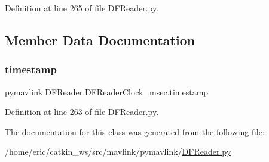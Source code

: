 Definition at line 265 of file D\+F\+Reader.\+py.



\subsection{Member Data Documentation}
\mbox{\label{classpymavlink_1_1DFReader_1_1DFReaderClock__msec_a98740f18c4eded09309955cc7fbbb44c}} 
\subsubsection{\texorpdfstring{timestamp}{timestamp}}
{\footnotesize\ttfamily pymavlink.\+D\+F\+Reader.\+D\+F\+Reader\+Clock\+\_\+msec.\+timestamp}



Definition at line 263 of file D\+F\+Reader.\+py.



The documentation for this class was generated from the following file\+:\begin{DoxyCompactItemize}
\item 
/home/eric/catkin\+\_\+ws/src/mavlink/pymavlink/\mbox{\hyperlink{DFReader_8py}{D\+F\+Reader.\+py}}\end{DoxyCompactItemize}
